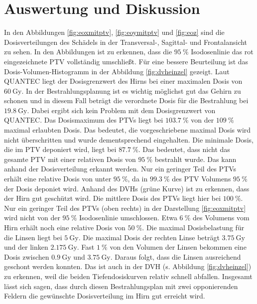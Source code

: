 \section{Auswertung und Diskussion}
\label{sec:DiskussionAuswertung}
In den Abbildungen \ref{fig:eoxmitptv}, \ref{fig:eoymitptv} und \ref{fig:eoz} sind die Dosisverteilungen des Schädels in der Transversal-, Sagittal- und Frontalansicht zu sehen. In den Abbildungen ist zu erkennen, dass die $\SI{95}{\percent}$ Isodosenlinie das rot eingezeichnete PTV vollständig umschließt. Für eine bessere Beurteilung ist das Dosis-Volumen-Histogramm in der Abbildung \ref{fig:dvheinzel} gezeigt.
Laut QUANTEC liegt der Dosisgrenzwert des Hirns bei einer maximalen Dosis von $\SI{60}{\gray}$. In der Bestrahlungsplanung ist es wichtig möglichst gut das Gehirn zu schonen und in diesem Fall beträgt die verordnete Dosis für die Bestrahlung bei $\SI{19,8}{\gray}$. Dabei ergibt sich kein Problem mit dem Dosisgrenzwert von QUANTEC. Das Dosismaximum des PTVs liegt bei $\SI{103.7}{\percent}$ von der $\SI{109}{\percent}$ maximal erlaubten Dosis. Das bedeutet, die vorgeschriebene maximal Dosis wird nicht überschritten und wurde dementsprechend eingehalten. Die minimale Dosis, die im PTV deponiert wird, liegt bei $\SI{87,7}{\percent}$. Das bedeutet, dass nicht das gesamte PTV mit einer relativen Dosis von $\SI{95}{\percent}$ bestrahlt wurde. Das kann anhand der Dosisverteilung erkannt werden. Nur ein geringer Teil des PTVs erhält eine relative Dosis von unter $\SI{95}{\percent}$, da in $\SI{99,3}{\percent}$ des PTV Volumens $\SI{95}{\percent}$ der Dosis deponiet wird. Anhand des DVHs (grüne Kurve) ist zu erkennen, dass der Hirn gut geschützt wird. Die mittlere Dosis des PTVs liegt hier bei $\SI{100}{\percent}$. Nur ein geringer Teil des PTVs (oben rechts) in der Darstellung \ref{fig:eoxmitptv} wird nicht von der $\SI{95}{\percent}$ Isodosenlinie umschlossen. Etwa $\SI{6}{\percent}$ des Volumens vom Hirn erhält noch eine relative Dosis von $\SI{50}{\percent}$. 
Die maximal Dosisbelastung für die Linsen liegt bei $\SI{5}{\gray}$. Die maximal Dosis der rechten Linse beträgt $\SI{3,75}{\gray}$ und der linken $\SI{2,175}{\gray}$. Fast $\SI{1}{\percent}$ von den Volumen der Linsen bekommen eine Dosis zwischen $\SI{0,9}{\gray}$ und $\SI{3,75}{\gray}$. Daraus folgt, dass die Linsen ausreichend geschont werden konnten. Das ist auch in der DVH (s. Abbildung \ref{fig:dvheinzel}) zu erkennen, weil die beiden Tiefendosiskurven relativ schnell abfallen.
Insgesamt lässt sich sagen, dass durch diesen Bestrahlungsplan mit zwei opponierenden Feldern die gewünschte Dosisverteilung im Hirn gut erreicht wird. 


